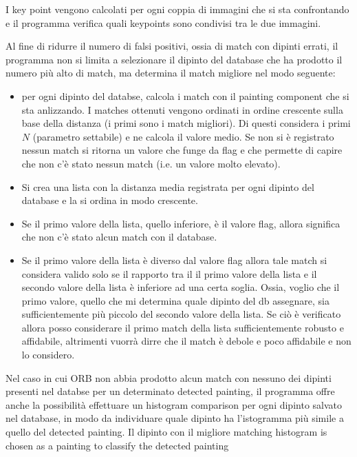 \documentclass[10pt,twocolumn,letterpaper]{article}
\begin{document}
I key point vengono calcolati per ogni coppia di immagini che si sta confrontando e il programma verifica quali keypoints sono condivisi tra le due immagini. 


Al fine di ridurre il numero di falsi positivi, ossia di match con dipinti errati, il programma non si limita a selezionare il dipinto del database che ha prodotto il numero più alto di match, ma determina il match migliore nel modo seguente:
\begin{itemize}
   \item per ogni dipinto del databse, calcola i match con il painting component che si sta anlizzando. I matches ottenuti vengono ordinati in ordine crescente sulla base della distanza (i primi sono i match migliori). Di questi considera i primi $N$ (parametro settabile) e ne calcola il valore medio. Se non si è registrato nessun match si ritorna un valore che funge da flag e che permette di capire che non c'è stato nessun match (i.e. un valore molto elevato).
   
   \item Si crea una lista con la distanza media registrata per ogni dipinto del database e la si ordina in modo crescente.
   
   \item Se il primo valore della lista, quello inferiore, è il valore flag, allora significa che non c'è stato alcun match con il database.
   
   \item Se il primo valore della lista è diverso dal valore flag allora tale match si considera valido solo se il rapporto tra il il primo valore della lista e il secondo valore della lista è inferiore ad una certa soglia. Ossia, voglio che il primo valore, quello che mi determina quale dipinto del db assegnare, sia sufficientemente più piccolo del secondo valore della lista. Se ciò è verificato allora posso considerare il primo match della lista sufficientemente robusto e affidabile, altrimenti vuorrà dirre che il match è debole e poco affidabile e non lo considero.
\end{itemize}

Nel caso in cui ORB non abbia prodotto alcun match con nessuno dei dipinti presenti nel databse per un determinato detected painting, il programma offre anche la possibilità effettuare un histogram comparison per ogni dipinto salvato nel database, in modo da individuare quale dipinto ha l'istogramma più simile a quello del detected painting. Il dipinto con il migliore matching histogram is chosen as a painting to classify the detected painting
\end{document}
